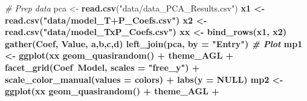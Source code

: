\documentclass[
]{article}
\newenvironment{Shaded}{\begin{snugshade}}{\end{snugshade}}
\newcommand{\CommentTok}[1]{\textcolor[rgb]{0.56,0.35,0.01}{\textit{#1}}}
\newcommand{\DataTypeTok}[1]{\textcolor[rgb]{0.13,0.29,0.53}{#1}}
\newcommand{\KeywordTok}[1]{\textcolor[rgb]{0.13,0.29,0.53}{\textbf{#1}}}
\newcommand{\NormalTok}[1]{#1}
\newcommand{\OperatorTok}[1]{\textcolor[rgb]{0.81,0.36,0.00}{\textbf{#1}}}
\newcommand{\OtherTok}[1]{\textcolor[rgb]{0.56,0.35,0.01}{#1}}
\newcommand{\StringTok}[1]{\textcolor[rgb]{0.31,0.60,0.02}{#1}}
\begin{document}
\begin{Shaded}
\begin{Highlighting}[]
\CommentTok{# Prep data}
\NormalTok{pca <-}\StringTok{ }\KeywordTok{read.csv}\NormalTok{(}\StringTok{"data/data_PCA_Results.csv"}\NormalTok{) }\OperatorTok{%
\NormalTok{x1 <-}\StringTok{ }\KeywordTok{read.csv}\NormalTok{(}\StringTok{"data/model_T+P_Coefs.csv"}\NormalTok{) }\OperatorTok{%
\NormalTok{x2 <-}\StringTok{ }\KeywordTok{read.csv}\NormalTok{(}\StringTok{"data/model_TxP_Coefs.csv"}\NormalTok{) }\OperatorTok{%
\NormalTok{xx <-}\StringTok{ }\KeywordTok{bind_rows}\NormalTok{(x1, x2) }\OperatorTok{%
\StringTok{  }\KeywordTok{gather}\NormalTok{(Coef, Value, a,b,c,d) }\OperatorTok{%
\StringTok{  }\KeywordTok{left_join}\NormalTok{(pca, }\DataTypeTok{by =} \StringTok{"Entry"}\NormalTok{) }\OperatorTok{%
\CommentTok{# Plot}
\NormalTok{mp1 <-}\StringTok{ }\KeywordTok{ggplot}\NormalTok{(xx}\OperatorTok{%
\StringTok{  }\KeywordTok{geom_quasirandom}\NormalTok{() }\OperatorTok{+}\StringTok{ }\NormalTok{theme_AGL }\OperatorTok{+}
\StringTok{  }\KeywordTok{facet_grid}\NormalTok{(Coef}\OperatorTok{~}\NormalTok{Model, }\DataTypeTok{scales =} \StringTok{"free_y"}\NormalTok{) }\OperatorTok{+}\StringTok{ }
\StringTok{  }\KeywordTok{scale_color_manual}\NormalTok{(}\DataTypeTok{values =}\NormalTok{ colors) }\OperatorTok{+}\StringTok{ }\KeywordTok{labs}\NormalTok{(}\DataTypeTok{y =} \OtherTok{NULL}\NormalTok{)}
\NormalTok{mp2 <-}\StringTok{ }\KeywordTok{ggplot}\NormalTok{(xx}\OperatorTok{%
\StringTok{  }\KeywordTok{geom_quasirandom}\NormalTok{() }\OperatorTok{+}\StringTok{ }\NormalTok{theme_AGL }\OperatorTok{+}
}}}}}}}}
\end{Highlighting}
\end{Shaded}
\end{document}
